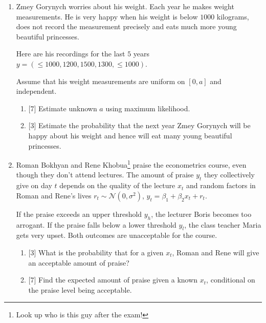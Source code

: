 \documentclass[12pt]{article}
\newcommand \cN{\mathcal{N}}
\begin{document}
\begin{enumerate}
    \item Zmey Gorynych worries about his weight. 
    Each year he makes weight measurements.
    He is very happy when his weight is below $1000$ kilograms, does not record the measurement precisely and eats much more young beautiful princesses.

    Here are his recordings for the last $5$ years $y = (\leq 1000, 1200, 1500, 1300, \leq 1000)$.

    Assume that his weight measurements are uniform on $[0, a]$ and independent.

    \begin{enumerate}
        \item {[7]} Estimate unknown $a$ using maximum likelihood. 
        \item {[3]} Estimate the probability that the next year Zmey Gorynych will be happy about his weight and hence will eat many young beautiful princesses.
    \end{enumerate}
    
    \item %
Roman Bokhyan and Rene Khobua\footnote{Look up who is this guy after the exam!} praise the econometrics course, even though they don't attend lectures. 
The amount of praise $y_t$ they collectively give on day $t$ depends on the quality of the lecture $x_t$ and random factors in Roman and Rene's lives $r_t \sim \cN(0, \sigma^2)$,
$y_t = \beta_1 + \beta_2 x_t + r_t$.

If the praise exceeds an upper threshold $y_h$, the lecturer Boris becomes too arrogant.
If the praise falls below a lower threshold $y_l$, the class teacher Maria gets very upset.
Both outcomes are unacceptable for the course.

\begin{enumerate}
    \item {[3]} What is the probability that for a given $x_t$, Roman and Rene will give an acceptable amount of praise?
    \item {[7]} Find the expected amount of praise given a known $x_t$, conditional on the praise level being acceptable.
\end{enumerate}



\end{enumerate}
\end{document}
